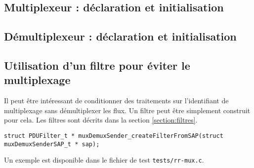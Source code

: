 \subsection{Multiplexeur : déclaration et initialisation}


%
\subsection{Démultiplexeur : déclaration et initialisation}

%
\subsection{Utilisation d'un filtre pour éviter le multiplexage}

   Il peut être intéressant de conditionner des traitements sur
l'identifiant de multiplexage sans démultiplexer les flux. Un filtre
peut être simplement construit pour cela. Les filtres sont décrits
dans la section \ref{section:filtres}.

\begin{verbatim}
struct PDUFilter_t * muxDemuxSender_createFilterFromSAP(struct muxDemuxSenderSAP_t * sap);
\end{verbatim}

   Un exemple est disponible dans le fichier de test {\tt tests/rr-mux.c}.
